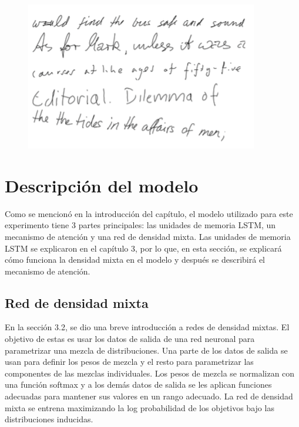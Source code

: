 \begin{figure}[h]
\begin{center}
\includegraphics{./imag/iam.png}
\end{center}
\caption{}
\end{figure}

\section{Descripción del modelo}
Como se mencionó en la introducción del capítulo, el modelo utilizado para este experimento tiene 3 partes principales: las unidades de memoria LSTM, un mecanismo de atención y una red de densidad mixta. Las unidades de memoria LSTM se explicaron en el capítulo 3, por lo que, en esta sección, se explicará cómo funciona la densidad mixta en el modelo y después se describirá el mecanismo de atención. 

\subsection{Red de densidad mixta}
En la sección 3.2, se dio una breve introducción a redes de densidad mixtas. El objetivo de estas es usar los datos de salida de una red neuronal para parametrizar una mezcla de distribuciones. Una parte de los datos de salida se usan para definir los pesos de mezcla y el resto para parametrizar las componentes de las mezclas individuales. Los pesos de mezcla se normalizan con una función softmax y a los demás datos de salida se les aplican funciones adecuadas para mantener sus valores en un rango adecuado. La red de densidad mixta se entrena maximizando la log probabilidad de los objetivos bajo las distribuciones inducidas.
\cite{DBLP:journals/corr/Graves13}

\vspace{1em}

